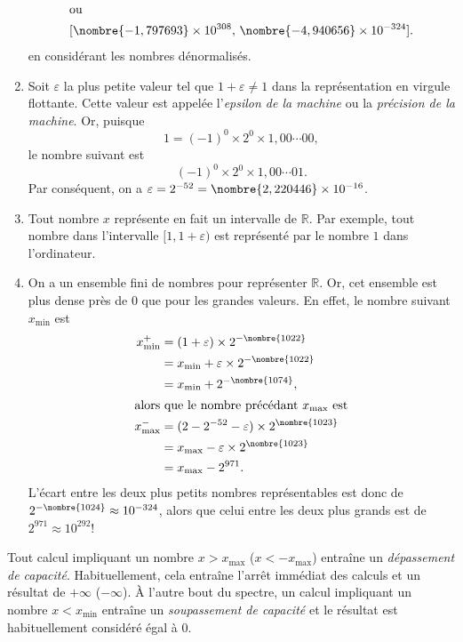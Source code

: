\documentclass[letterpaper,11pt,english,french]{memoir}
\theoremstyle{plain}
\theoremstyle{definition}
\theoremstyle{remark}
\begin{document}
\begin{enumerate}
\begin{gather*}
    \intertext{ou}
    [\nombre{-1,797693} \times 10^{308},\,
     \nombre{-4,940656} \times 10^{-324}].
  \end{gather*}
  en considérant les nombres dénormalisés.
\item Soit $\varepsilon$ la plus petite valeur tel que $1 +
  \varepsilon \neq 1$ dans la représentation en virgule flottante.
  Cette valeur est appelée l'\emph{epsilon de la machine} ou la
  \emph{précision de la machine}. Or, puisque
  \begin{equation*}
    1 = (-1)^0 \times 2^0 \times 1,00\cdots00,
  \end{equation*}
  le nombre suivant est
  \begin{equation*}
    (-1)^0 \times 2^0 \times 1,00\cdots01.
  \end{equation*}
  Par conséquent, on a $\varepsilon = 2^{-52} = \nombre{2,220446}
  \times 10^{-16}$.
\item Tout nombre $x$ représente en fait un intervalle de
  $\mathbb{R}$. Par exemple, tout nombre dans l'intervalle $[1, 1 +
  \varepsilon)$ est représenté par le nombre $1$ dans l'ordinateur.
\item On a un ensemble fini de nombres pour représenter $\mathbb{R}$.
  Or, cet ensemble est plus dense près de $0$ que pour les grandes
  valeurs. En effet, le nombre suivant $x_{\text{min}}$ est
  \begin{align*}
    x_{\text{min}}^+
    &= (1 + \varepsilon) \times 2^{-\nombre{1022}} \\
    &= x_{\text{min}} + \varepsilon \times 2^{-\nombre{1022}} \\
    &= x_{\text{min}} + 2^{-\nombre{1074}}, \\
    \intertext{alors que le nombre précédant $x_{\text{max}}$ est}
    x_{\text{max}}^-
    &= (2 - 2^{-52} - \varepsilon) \times 2^{\nombre{1023}} \\
    &= x_{\text{max}} - \varepsilon \times 2^{\nombre{1023}} \\
    &= x_{\text{max}} - 2^{971}.
  \end{align*}
  L'écart entre les deux plus petits nombres représentables est donc de
  $2^{-\nombre{1024}} \approx 10^{-324}$, alors que celui entre les deux plus
  grands est de $2^{971} \approx 10^{292}$!
\end{enumerate}

Tout calcul impliquant un nombre $x > x_{\text{max}}$ ($x <
-x_{\text{max}}$) entraîne un \emph{dépassement de capacité}.
Habituellement, cela entraîne l'arrêt immédiat des calculs et un
résultat de $+\infty$ ($-\infty$). À l'autre bout du spectre, un
calcul impliquant un nombre $x < x_{\text{min}}$ entraîne un
\emph{soupassement de capacité} et le résultat est habituellement
considéré égal à $0$.
\end{document}

